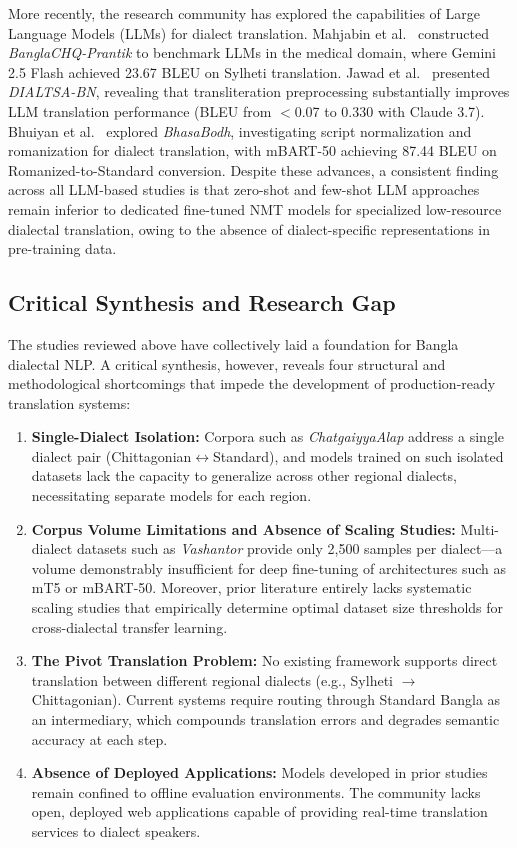 \documentclass[12pt,a4paper]{article}
\begin{document}
More recently, the research community has explored the capabilities of Large Language Models (LLMs) for dialect translation. Mahjabin et al.~\cite{mahjabin2025banglachq} constructed \textit{BanglaCHQ-Prantik} to benchmark LLMs in the medical domain, where Gemini 2.5 Flash achieved 23.67 BLEU on Sylheti translation. Jawad et al.~\cite{jawad2025dialtsa} presented \textit{DIALTSA-BN}, revealing that transliteration preprocessing substantially improves LLM translation performance (BLEU from $<$0.07 to 0.330 with Claude 3.7). Bhuiyan et al.~\cite{bhuiyan2025bhasabodh} explored \textit{BhasaBodh}, investigating script normalization and romanization for dialect translation, with mBART-50 achieving 87.44 BLEU on Romanized-to-Standard conversion. Despite these advances, a consistent finding across all LLM-based studies is that zero-shot and few-shot LLM approaches remain inferior to dedicated fine-tuned NMT models for specialized low-resource dialectal translation, owing to the absence of dialect-specific representations in pre-training data.

\subsection{Critical Synthesis and Research Gap}
The studies reviewed above have collectively laid a foundation for Bangla dialectal NLP. A critical synthesis, however, reveals four structural and methodological shortcomings that impede the development of production-ready translation systems:

\begin{enumerate}[leftmargin=*]
    \item \textbf{Single-Dialect Isolation:} Corpora such as \textit{ChatgaiyyaAlap} address a single dialect pair (Chittagonian$\leftrightarrow$Standard), and models trained on such isolated datasets lack the capacity to generalize across other regional dialects, necessitating separate models for each region.
    \item \textbf{Corpus Volume Limitations and Absence of Scaling Studies:} Multi-dialect datasets such as \textit{Vashantor} provide only 2,500 samples per dialect---a volume demonstrably insufficient for deep fine-tuning of architectures such as mT5 or mBART-50. Moreover, prior literature entirely lacks systematic scaling studies that empirically determine optimal dataset size thresholds for cross-dialectal transfer learning.
    \item \textbf{The Pivot Translation Problem:} No existing framework supports direct translation between different regional dialects (e.g., Sylheti $\rightarrow$ Chittagonian). Current systems require routing through Standard Bangla as an intermediary, which compounds translation errors and degrades semantic accuracy at each step.
    \item \textbf{Absence of Deployed Applications:} Models developed in prior studies remain confined to offline evaluation environments. The community lacks open, deployed web applications capable of providing real-time translation services to dialect speakers.
\end{enumerate}
\end{document}
